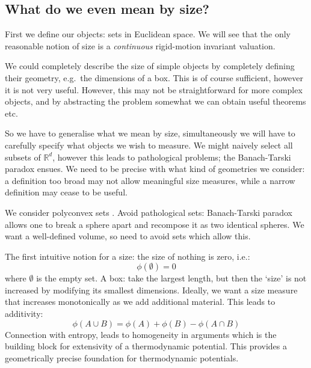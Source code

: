 \subsection{What do we even mean by size?}

First we define our objects: sets in Euclidean space.
We will see that the only reasonable notion of size is a \emph{continuous} rigid-motion invariant valuation.

We could completely describe the size of simple objects by completely defining their geometry, e.g.\ the dimensions of a box.
This is of course sufficient, however it is not very useful.
However, this may not be straightforward for more complex objects, and by abstracting the problem somewhat we can obtain useful theorems etc.

So we have to generalise what we mean by size, simultaneously we will have to carefully specify what objects we wish to measure.
We might naively select all subsets of $\mathbb{R}^d$, however this leads to pathological problems; the Banach-Tarski paradox ensues.
We need to be precise with what kind of geometries we consider: a definition too broad may not allow meaningful size measures, while a narrow definition may cease to be useful.

We consider polyconvex sets%
.
Avoid pathological sets: Banach-Tarski paradox allows one to break a sphere apart and recompose it as two identical spheres.
We want a well-defined volume, so need to avoid sets which allow this.

The first intuitive notion for a size: the size of nothing is zero, i.e.:
\begin{equation}
  \phi(\emptyset) = 0
\end{equation}
where $\emptyset$ is the empty set.
A box: take the largest length, but then the `size' is not increased by modifying its smallest dimensions.
Ideally, we want a size measure that increases monotonically as we add additional material. This leads to additivity:
\begin{equation}
  \phi(A \cup B) = \phi(A) + \phi(B) - \phi(A \cap B)
\end{equation}
Connection with entropy, leads to homogeneity in arguments which is the building block for extensivity of a thermodynamic potential.
This provides a geometrically precise foundation for thermodynamic potentials.

